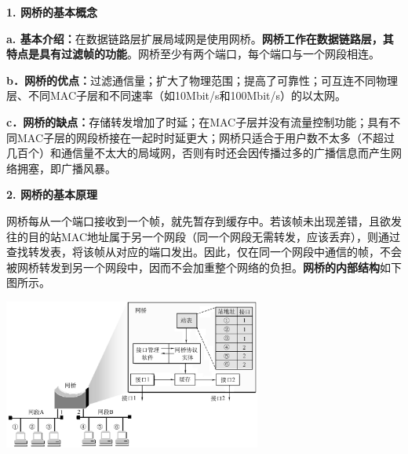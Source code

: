 \textbf{{1. 网桥的基本概念}}

{{\textbf{a.
基本介绍：}}在数据链路层扩展局域网是使用网桥。}{{\textbf{网桥}}\textbf{工作在数据链路层，其特点是具有过滤帧的功能}。网桥至少有两个端口，每个端口与一个网段相}{连。}

{\textbf{b．网桥的优点：}}{过滤通信量；}{扩大了物理范围；}{提高了可靠性；}{可互连不同物理层、不同MAC子层和不同速率（如10Mbit/s和100Mbit/s）的以太网。}

{\textbf{c．网桥的缺点：}}{存储转发增加了时延；}{在MAC子层并没有流量控制功能；}{具有不同MAC子层的网段桥接在一起时时延更大；}{网桥只适合于用户数不太多（不超过几百个）和通信量不太大的局域网，否则有时还会因传播过多的广播信息而产生网络拥塞，即广播风暴。}

\textbf{{2. 网桥的基本原理}}

{网桥每从一个端口接收到一个帧，就先暂存到缓存中。若该帧未出现差错，且欲发往的目的站MAC地址属于另一个网段（同一个网段无需转发，应该丢弃），则通过查找转发表，将该帧从对应的端口发出。因此，仅在同一个网段中通信的帧，不会被网桥转发到另一个网段中，因而不会加重整个网络的负担。}\textbf{网桥的内部结构}{如下图所示。}

\includegraphics[width=3.33333in,height=1.93750in]{png-jpeg-pics/9E6C6903CF9DA9A3638270B546273ACD.png}
